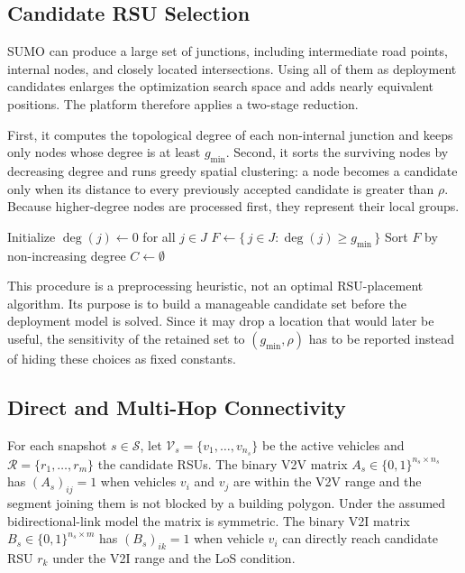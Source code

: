 \documentclass[engproc,proceedingpaper,submit,oneauthor]{Definitions/mdpi}
\begin{document}
	\subsection{Candidate RSU Selection}
	SUMO can produce a large set of junctions, including intermediate road points,
	internal nodes, and closely located intersections. Using all of them as deployment
	candidates enlarges the optimization search space and adds nearly equivalent
	positions. The platform therefore applies a two-stage reduction.
	
	First, it computes the topological degree of each non-internal junction and keeps
	only nodes whose degree is at least $g_{\min}$. Second, it sorts the surviving nodes
	by decreasing degree and runs greedy spatial clustering: a node becomes a candidate
	only when its distance to every previously accepted candidate is greater than $\rho$.
	Because higher-degree nodes are processed first, they represent their local groups.
	
	\begin{algorithm}[H]
		\caption{Candidate RSU filtering by degree and greedy spatial clustering}
		\label{alg:candidates}
		Initialize $\deg(j)\leftarrow 0$ for all $j\in J$\;
		$F\leftarrow\{\,j\in J:\deg(j)\ge g_{\min}\,\}$\;
		Sort $F$ by non-increasing degree\;
		$C\leftarrow\emptyset$\;
		\;
	\end{algorithm}
	
	This procedure is a preprocessing heuristic, not an optimal RSU-placement algorithm.
	Its purpose is to build a manageable candidate set before the deployment model is
	solved. Since it may drop a location that would later be useful, the sensitivity of
	the retained set to $(g_{\min},\rho)$ has to be reported instead of hiding these
	choices as fixed constants.
	
	\subsection{Direct and Multi-Hop Connectivity}
	For each snapshot $s\in\mathcal S$, let $\mathcal V_s=\{v_1,\ldots,v_{n_s}\}$ be the
	active vehicles and $\mathcal R=\{r_1,\ldots,r_m\}$ the candidate RSUs. The binary
	V2V matrix $A_s\in\{0,1\}^{n_s\times n_s}$ has $(A_s)_{ij}=1$ when vehicles $v_i$ and
	$v_j$ are within the V2V range and the segment joining them is not blocked by a
	building polygon. Under the assumed bidirectional-link model the matrix is symmetric.
	The binary V2I matrix $B_s\in\{0,1\}^{n_s\times m}$ has $(B_s)_{ik}=1$ when vehicle
	$v_i$ can directly reach candidate RSU $r_k$ under the V2I range and the LoS
	condition.
	
\end{document}
